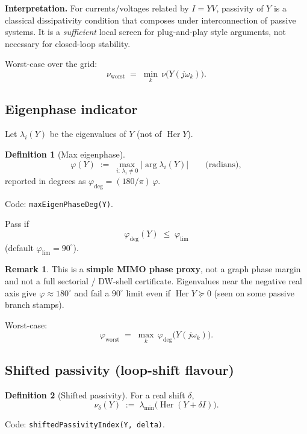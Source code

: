 \documentclass[11pt,a4paper]{article}
\theoremstyle{definition}
\newtheorem{definition}{Definition}
\newtheorem{remark}{Remark}
\begin{document}
\textbf{Interpretation.}
For currents/voltages related by $I=YV$, passivity of $Y$ is a classical
dissipativity condition that composes under interconnection of passive
systems. It is a \emph{sufficient} local screen for plug-and-play style
arguments, not necessary for closed-loop stability.

Worst-case over the grid:
\begin{equation}
  \nu_{\mathrm{worst}}
  \;=\;
  \min_{k}\,\nu\bigl(Y(j\omega_k)\bigr).
\end{equation}

\subsection{Eigenphase indicator}

Let $\lambda_i(Y)$ be the eigenvalues of $Y$ (not of $\operatorname{Her} Y$).
\begin{definition}[Max eigenphase]
\[
  \varphi(Y)
  \;:=\;
  \max_{i:\,\lambda_i\neq 0}
  \bigl|\arg\lambda_i(Y)\bigr|
  \qquad\text{(radians)},
\]
reported in degrees as $\varphi_{\deg}=(180/\pi)\,\varphi$.
\end{definition}
Code: \texttt{maxEigenPhaseDeg(Y)}.

Pass if
\begin{equation}
  \varphi_{\deg}(Y)
  \;\le\;
  \varphi_{\mathrm{lim}}
\end{equation}
(default $\varphi_{\mathrm{lim}}=90^\circ$).

\begin{remark}
This is a \textbf{simple MIMO phase proxy}, not a graph phase margin and not
a full sectorial / DW-shell certificate. Eigenvalues near the negative real
axis give $\varphi\approx 180^\circ$ and fail a $90^\circ$ limit even if
$\operatorname{Her} Y\succeq 0$ (seen on some passive branch stamps).
\end{remark}

Worst-case:
\begin{equation}
  \varphi_{\mathrm{worst}}
  \;=\;
  \max_{k}\,\varphi_{\deg}\bigl(Y(j\omega_k)\bigr).
\end{equation}

\subsection{Shifted passivity (loop-shift flavour)}

\begin{definition}[Shifted passivity]
For a real shift $\delta$,
\[
  \nu_\delta(Y)
  \;:=\;
  \lambda_{\min}\!\bigl(\operatorname{Her}(Y+\delta I)\bigr).
\]
\end{definition}
Code: \texttt{shiftedPassivityIndex(Y, delta)}.
\end{document}
